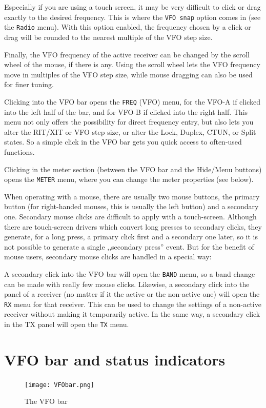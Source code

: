 \documentclass[12pt]{book}
\def\rett#1{\texttt{\color{red}#1}}
\def\bltt#1{\texttt{\color{blue}#1}}
\begin{document}
Especially if you are using a touch screen, it may be very difficult
to click or drag exactly to the desired frequency. This is where
the \rett{VFO snap} option comes in (see the \bltt{Radio} menu).
With this option enabled, the frequency chosen by a click or drag
will be rounded to the nearest multiple of the VFO step size.

 Finally, the VFO frequency of the active
receiver can be changed by the scroll wheel of the mouse, if there
is any. Using the scroll wheel lets the VFO frequency move in multiples
of the VFO step size, while mouse dragging can also be used for
finer tuning.

Clicking into the VFO bar opens the \bltt{FREQ} (VFO) menu,
for the VFO-A if clicked into the left half of the bar, and for
VFO-B if clicked into the right half. This menu not only offers
the possibility for direct frequency entry, but also lets you
alter the RIT/XIT or VFO step size, or alter the Lock, Duplex,
CTUN, or Split states. So a simple click in the VFO bar
gets you quick access to often-used functions.

Clicking in the meter section (between the VFO bar and the
Hide/Menu buttons) opens the \bltt{METER} menu, where
you can change the meter properties (see below).

When operating with a mouse, there are usually two mouse buttons,
the primary button (for right-handed mouses, this is usually
the left button) and a secondary one. Secondary mouse clicks
are difficult to apply with a touch-screen. Although there are
touch-screen drivers which convert long presses to secondary clicks,
they generate, for a long press, a primary click first and a
secondary one later, so it is not possible to generate a
single ,,secondary press'' event. But for the benefit of
mouse users, secondary mouse clicks are handled in a special way:

A secondary click into the VFO bar will open the \bltt{BAND} menu,
so a band change can be made with really few mouse clicks. Likewise,
a secondary click into the panel of a receiver (no matter if it
the active or the non-active one) will open the \bltt{RX} menu
for that receiver. This can be used to change the settings of a
non-active receiver without making it temporarily active. In the
same way, a secondary click in the TX panel will open the
\bltt{TX} menu.

\section{VFO bar and status  indicators}
\label{sec:VFObar}
\begin{figure}[ht]
\center
\texttt{[image: VFObar.png]}
\caption{The VFO bar}
\label{fig:VFObar}
\end{figure}
\end{document}
